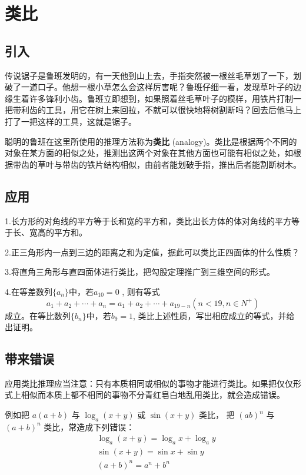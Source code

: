 \documentclass{article}
\begin{document}
\section{类比}
\subsection{引入}
    传说锯子是鲁班发明的，有一天他到山上去，手指突然被一根丝毛草划了一下，划破了一道口子。他想一根小草怎么会这样厉害呢？鲁班仔细一看，发现草叶子的边缘生着许多锋利小齿。鲁班立即想到，如果照着丝毛草叶子的模样，用铁片打制一把带利齿的工具，用它在树上来回拉，不就可以很快地将树割断吗？回去后他马上打了一把这样的工具，这就是锯子。
    
    聪明的鲁班在这里所使用的推理方法称为\textbf{类比} (analogy)。类比是根据两个不同的对象在某方面的相似之处，推测出这两个对象在其他方面也可能有相似之处，如根据带齿的草叶与带齿的铁片结构相似，由前者能划破手指，推出后者能割断树木。
\subsection{应用}
    1.长方形的对角线的平方等于长和宽的平方和，类比出长方体的体对角线的平方等于长、宽高的平方和。
    
    2.正三角形内一点到三边的距离之和为定值，据此可以类比正四面体的什么性质？
    
    3.将直角三角形与直四面体进行类比，把勾股定理推广到三维空间的形式。
    
    4.在等差数列$\{a_n\}$中，若$ a_{10} = 0$ , 则有等式\[a_1+a_2+\cdots+a_n=a_1+a_2+\cdots+a_{19 - n}(n<19,n\in N^+)\]成立。在等比数列$\{b_n\}$中，若$b_9=1$,  类比上述性质，写出相应成立的等式，并给出证明。
\subsection{带来错误}
    应用类比推理应当注意：只有本质相同或相似的事物才能进行类比。如果把仅仅形式上相似而本质上都不相同的事物不分青红皂白地乱用类比，就会造成错误。
    
    例如把 $a(a+b)$ 与 $\log_a(x+y)$ 或 $\sin(x+y)$ 类比， 把 $(ab)^n$ 与 $(a+b)^n$ 类比，常造成下列错误：
    \begin{align*}
      &\log_ a(x+y)=\log_ax+\log_ay\\
      &\sin(x+y)=\sin x+\sin y\\
      &(a+b)^n=a^n+b^n
    \end{align*}
    
\end{document}
